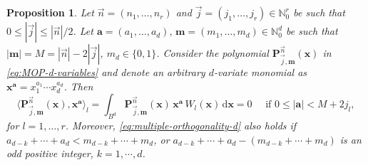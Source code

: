 \documentclass[a4paper]{article}
\theoremstyle{plain}
\newtheorem{proposition}[theorem]{Proposition}
\theoremstyle{definition}
\newcommand{\NN}{\mathbb{N}}
\newcommand{\dr}{\mathrm{d}}
\begin{document}
    \begin{proposition}\label{prop:type-ii-orthogonality-d-vars}  Let $\vec n = (n_1,\dots,n_r)$ and $\vec j = (j_1,\dots,j_r)\in\NN_0^r$ be such that $0\leq |\vec j| \leq |\vec n|/2$. Let $\mathbf a=(a_1,\dots,a_d), \,\mathbf m =(m_1,\dots,m_d)\in\NN^d_0$ be such that $|\mathbf m|=M=|\vec n|-2|\vec j|$, $m_d\in\{0,1\}$. Consider the polynomial $\mathbf{P}_{\vec j,\mathbf m}^{\vec n}(\mathbf x)$ in \eqref{eq:MOP-d-variables} and denote an arbitrary $d$-variate monomial as $\mathbf x^{\mathbf a} = x_1^{a_1}\cdots x_d^{a_d}$. Then
    \begin{equation}
        \label{eq:multiple-orthogonality-d}
        \langle\mathbf{P}_{\vec j,\mathbf m}^{\vec n}(\mathbf x), \mathbf x^{\mathbf a}\rangle_l =\int_{B^d} \mathbf{P}_{\vec j,\mathbf m}^{\vec n}(\mathbf x)\, \mathbf x^{\mathbf a} \,W_l(\mathbf x)\, \dr\mathbf x = 0\quad \text{ if }0\leq|\mathbf a|< M +2j_l, 
    \end{equation}
    for $l=1,\dots,r$. Moreover, \eqref{eq:multiple-orthogonality-d} also holds if $a_{d-k}+\cdots+a_{d} < m_{d-k}+\cdots + m_{d}$, or $a_{d-k}+\cdots+a_{d} -( m_{d-k}+\cdots + m_{d})$ is an odd positive integer, $k=1,\cdots,d$.
    
    \end{proposition}
\end{document}

